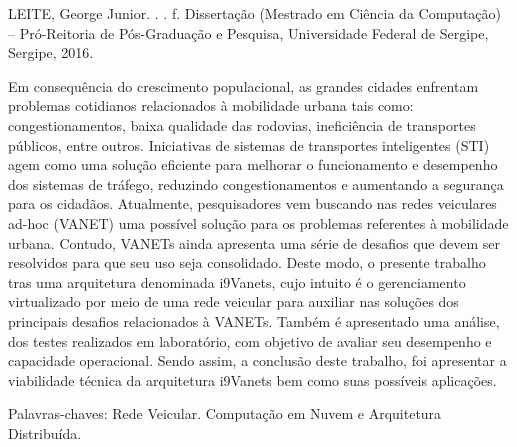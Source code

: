 \documentclass[
	12pt,				%
	oneside,			%
	a4paper,			%
	english,			%
	brazil				%
	]{abntex2ppgsi}
\begin{document}
\setlength{\absparsep}{18pt} %
\begin{resumo}

% 
%
% 
%
\begin{flushleft}
LEITE, George Junior. \textbf{\imprimirtitulo}. \imprimirdata. \pageref{LastPage} f. Dissertação (Mestrado em Ciência da Computação) – Pró-Reitoria de Pós-Graduação e Pesquisa, Universidade Federal de Sergipe, Sergipe, 2016.
\end{flushleft}

Em consequência do crescimento populacional, as grandes cidades enfrentam problemas cotidianos relacionados à mobilidade urbana tais como: congestionamentos, baixa qualidade das rodovias, ineficiência de transportes públicos, entre outros. Iniciativas de sistemas de transportes inteligentes (STI) agem como uma solução eficiente para melhorar o funcionamento e desempenho dos sistemas de tráfego, reduzindo congestionamentos e aumentando a segurança para os cidadãos. Atualmente, pesquisadores vem buscando nas redes veiculares ad-hoc (VANET) uma possível solução para os problemas referentes à mobilidade urbana. Contudo, VANETs ainda apresenta uma série de desafios que devem ser resolvidos para que seu uso seja consolidado.  Deste modo, o presente trabalho tras uma arquitetura denominada i9Vanets, cujo intuito é o gerenciamento virtualizado por meio de uma rede veicular para auxiliar nas soluções dos principais desafios relacionados à VANETs. Também é apresentado uma análise, dos testes realizados em laboratório, com objetivo de avaliar seu desempenho e capacidade operacional. Sendo assim, a conclusão deste trabalho, foi apresentar a viabilidade técnica da arquitetura i9Vanets bem como suas possíveis aplicações.


Palavras-chaves: Rede Veicular. Computação em Nuvem e Arquitetura Distribuída.
\end{resumo}
\end{document}
